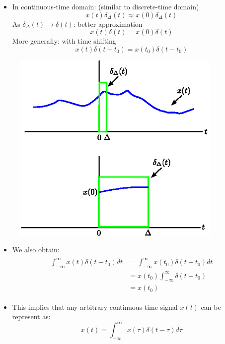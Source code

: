  \begin{minipage}{0.5\textwidth}
 \begin{itemize}
\item In continuous-time domain: (similar to discrete-time domain)
\[ x(t)\delta_{\Delta}(t) \approx x(0)\delta_{\Delta}(t) \]
As $\delta_{\Delta}(t)\rightarrow \delta(t)$: better approximation
\[ x(t)\delta(t) = x(0)\delta(t) \]
More generally: with time shifting
\[ x(t)\delta(t-t_{0}) = x(t_{0})\delta(t-t_{0}) \] 
\end{itemize}
\end{minipage}\hfill
\begin{minipage}{0.5\textwidth} 
    \begin{figure}[H]
    \centering 
    \includegraphics[width=0.9\textwidth]{images/unit_step_continuous_shift.eps}
    \caption{} 
\end{figure}
\end{minipage}
 
 \begin{itemize}
\item We also obtain:
\begin{align*}\begin{split}
\int_{-\infty}^{\infty} x(t)\delta(t-t_{0})dt &= \int_{-\infty}^{\infty} x(t_{0})\delta(t-t_{0})dt \\
&= x(t_{0})\int_{-\infty}^{\infty} \delta(t-t_{0})\\
&= x(t_{0}) 
\end{split}
\end{align*}
\item This implies that any arbitrary continuous-time signal $x(t)$ can be represent as:
\[ x(t) = \int_{-\infty}^{\infty} x(\tau)\delta(t-\tau)d\tau \]
\end{itemize}

